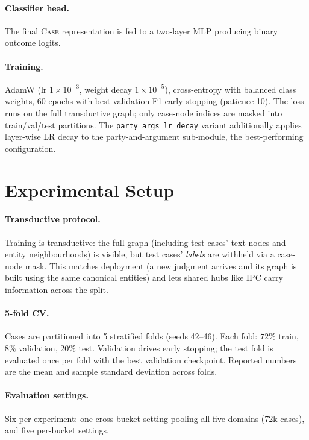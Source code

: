 \paragraph{Classifier head.} The final \textsc{Case} representation is fed to a two-layer MLP producing binary outcome logits.

\paragraph{Training.} AdamW (lr $1\!\times\!10^{-3}$, weight decay $1\!\times\!10^{-5}$), cross-entropy with balanced class weights, 60 epochs with best-validation-F1 early stopping (patience 10). The loss runs on the full transductive graph; only case-node indices are masked into train/val/test partitions. The \texttt{party\_args\_lr\_decay} variant additionally applies layer-wise LR decay to the party-and-argument sub-module, the best-performing configuration.

\section{Experimental Setup}

\paragraph{Transductive protocol.} Training is transductive: the full graph (including test cases' text nodes and entity neighbourhoods) is visible, but test cases' \emph{labels} are withheld via a case-node mask. This matches deployment (a new judgment arrives and its graph is built using the same canonical entities) and lets shared hubs like \textsc{IPC} carry information across the split.

\paragraph{5-fold CV.} Cases are partitioned into 5 stratified folds (seeds 42--46). Each fold: $72\%$ train, $8\%$ validation, $20\%$ test. Validation drives early stopping; the test fold is evaluated once per fold with the best validation checkpoint. Reported numbers are the mean and sample standard deviation across folds.

\paragraph{Evaluation settings.} Six per experiment: one cross-bucket setting pooling all five domains (72k cases), and five per-bucket settings.

